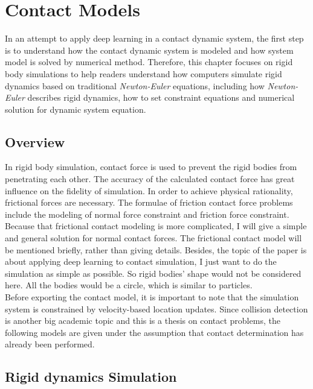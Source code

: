 
\chapter{Contact Models}
\label{cp:contact}
In an attempt to apply deep learning in a contact dynamic system, the first step is to understand how the contact dynamic system is modeled and how system model is solved by numerical method. Therefore, this chapter focuses on rigid body simulations to help readers understand how computers simulate rigid dynamics based on traditional \textit {Newton-Euler} equations, including how \textit {Newton-Euler} describes rigid dynamics, how to set constraint equations and numerical solution for dynamic system equation.

\section{Overview}

In rigid body simulation, contact force is used to prevent the rigid bodies from penetrating each other. The accuracy of the calculated contact force has great influence on the fidelity of simulation. In order to achieve physical rationality, frictional forces are necessary. The formulae of friction contact force problems include the modeling of normal force constraint and friction force constraint. Because that frictional contact modeling is more complicated, I will give a simple and general solution for normal contact forces. The frictional contact model will be mentioned briefly, rather than giving details. Besides, the topic of the paper is about applying deep learning to contact simulation, I just want to do the simulation as simple as possible. So rigid bodies' shape would not be considered here. All the bodies would be a circle, which is similar to particles.\\

Before exporting the contact model, it is important to note that the simulation system is constrained by velocity-based location updates\cite{Erleben:2007:VSP:1243980.1243986}. Since collision detection is another big academic topic\cite{boulic2007collision} and this is a thesis on contact problems, the following models are given under the assumption that contact determination has already been performed.

\section{Rigid dynamics Simulation}

